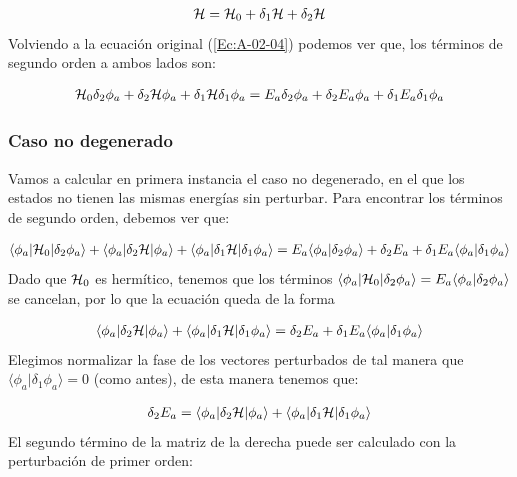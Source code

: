 \begin{eqnarray}
	\mathcal{H}= \mathcal{H}_0 +\delta_1 \mathcal{H} + \delta_2 \mathcal{H} 
\end{eqnarray}
Volviendo a la ecuación original (\ref{Ec:A-02-04}) podemos ver que, los términos de segundo orden a ambos lados son:

\begin{eqnarray}
	\mathcal{H}_0 \delta_2 \phi_a + \delta_2 \mathcal{H} \phi_a + \delta_1 \mathcal{H} \delta_1 \phi_a = E_a \delta_2 \phi_a + \delta_2 E_a \phi_a + \delta_1 E_a \delta_1 \phi_a
	\label{Ec:A-02-21}
\end{eqnarray}

\subsubsection{Caso no degenerado}

Vamos a calcular en primera instancia el caso no degenerado, en el que los estados no tienen las mismas energías sin perturbar. Para encontrar los términos de segundo orden, debemos ver que:

\begin{eqnarray*}
	\langle \phi_a | \mathcal{H}_0 | \delta_2 \phi_a \rangle + \langle \phi_a |\delta_2 \mathcal{H} | \phi_a \rangle + \langle \phi_a |\delta_1 \mathcal{H} | \delta_1 \phi_a \rangle = E_a \langle \phi_a |\delta_2 \phi_a \rangle + \delta_2 E_a + \delta_1 E_a \langle \phi_a |\delta_1 \phi_a \rangle 
\end{eqnarray*}
Dado que $\mathcal{H}_0$ es hermítico, tenemos que los términos $\langle \phi_a | \mathcal{H}_0 |\delta_2 \phi_a \rangle = E_a \langle \phi_a |\delta_2 \phi_a\rangle$ se cancelan, por lo que la ecuación queda de la forma

\begin{eqnarray}	
	\langle  \phi_a |\delta_2 \mathcal{H} |\phi_a \rangle + \langle \phi_a |\delta_1 \mathcal{H} | \delta_1 \phi_a \rangle =   \delta_2 E_a + \delta_1 E_a \langle \phi_a |\delta_1 \phi_a \rangle 
\end{eqnarray}
Elegimos normalizar la fase de los vectores perturbados de tal manera que $\langle \phi_a |\delta_1 \phi_a\rangle = 0$ (como antes), de esta manera tenemos que:

\begin{eqnarray}
	\delta_2 E_a = \langle \phi_a |\delta_2 \mathcal{H} |\phi_a \rangle + \langle \phi_a |\delta_1 \mathcal{H} |\delta_1 \phi_a \rangle
\end{eqnarray}
El segundo término de la matriz de la derecha puede ser calculado con la perturbación de primer orden:

